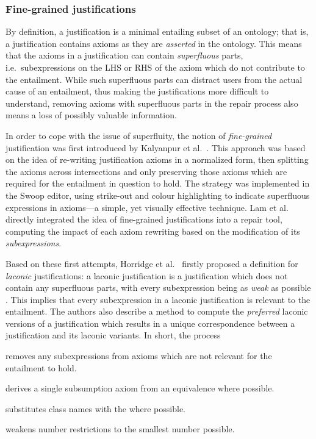\subsubsection{Fine-grained justifications}
By definition, a justification is a minimal entailing subset of an ontology; that is, a justification contains axioms as they are \emph{asserted} in the ontology. This means that the axioms in a justification can contain \emph{superfluous} parts, i.e.\ subexpressions on the LHS or RHS of the axiom which do not contribute to the entailment. While such superfluous parts can distract users from the actual cause of an entailment, thus making the justifications more difficult to understand, removing axioms with superfluous parts in the repair process also means a loss of possibly valuable information. 

In order to cope with the issue of superfluity, the notion of \emph{fine-grained} justification was first introduced by Kalyanpur et al.\ \cite{kalyanpur06fj}. This approach was based on the idea of re-writing justification axioms in a normalized form, then splitting the axioms across intersections and only preserving those axioms which are required for the entailment in question to hold. The strategy was implemented in the Swoop editor, using strike-out and colour highlighting to indicate superfluous expressions in axioms---a simple, yet visually effective technique. Lam et al.\ \cite{lam06tk} directly integrated the idea of fine-grained justifications into a repair tool, computing the impact of each axiom rewriting based on the modification of its \emph{subexpressions}.

Based on these first attempts, Horridge et al.\ \cite{horridge08yi} firstly proposed a definition for \emph{laconic} justifications: a laconic justification is a justification which does not contain any superfluous parts, with every subexpression being as \emph{weak} as possible \cite{horridge08yi}. This implies that every subexpression in a laconic justification is relevant to the entailment. The authors \cite{horridge08yi} also describe a method to compute the \emph{preferred} laconic versions of a justification which results in a unique correspondence between a justification and its laconic variants. In short, the process
\begin{compactitem}
\item removes any subexpressions from axioms which are not relevant for the entailment to hold.
\item derives a single subsumption axiom from an equivalence where possible.
\item substitutes class names with the \thing where possible.
\item weakens number restrictions to the smallest number possible.
\end{compactitem}

